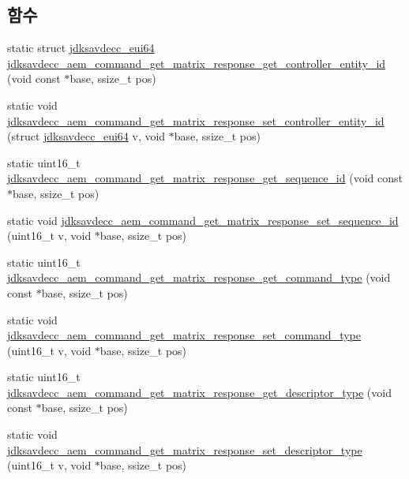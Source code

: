 \subsection*{함수}
\begin{DoxyCompactItemize}
\item 
static struct \hyperlink{structjdksavdecc__eui64}{jdksavdecc\+\_\+eui64} \hyperlink{group__command__get__matrix__response_ga5a241a121678094e29e9a07c0ed04ced}{jdksavdecc\+\_\+aem\+\_\+command\+\_\+get\+\_\+matrix\+\_\+response\+\_\+get\+\_\+controller\+\_\+entity\+\_\+id} (void const $\ast$base, ssize\+\_\+t pos)
\item 
static void \hyperlink{group__command__get__matrix__response_ga9e3f28470511eb5369e2586320e3ef57}{jdksavdecc\+\_\+aem\+\_\+command\+\_\+get\+\_\+matrix\+\_\+response\+\_\+set\+\_\+controller\+\_\+entity\+\_\+id} (struct \hyperlink{structjdksavdecc__eui64}{jdksavdecc\+\_\+eui64} v, void $\ast$base, ssize\+\_\+t pos)
\item 
static uint16\+\_\+t \hyperlink{group__command__get__matrix__response_ga28c83fd2f23634391b757edbf3bb09d7}{jdksavdecc\+\_\+aem\+\_\+command\+\_\+get\+\_\+matrix\+\_\+response\+\_\+get\+\_\+sequence\+\_\+id} (void const $\ast$base, ssize\+\_\+t pos)
\item 
static void \hyperlink{group__command__get__matrix__response_ga4960574ef677af539e9538f54f06f518}{jdksavdecc\+\_\+aem\+\_\+command\+\_\+get\+\_\+matrix\+\_\+response\+\_\+set\+\_\+sequence\+\_\+id} (uint16\+\_\+t v, void $\ast$base, ssize\+\_\+t pos)
\item 
static uint16\+\_\+t \hyperlink{group__command__get__matrix__response_gad5214f8f0eb608a58db65cace21f5257}{jdksavdecc\+\_\+aem\+\_\+command\+\_\+get\+\_\+matrix\+\_\+response\+\_\+get\+\_\+command\+\_\+type} (void const $\ast$base, ssize\+\_\+t pos)
\item 
static void \hyperlink{group__command__get__matrix__response_ga6e180533ac3299a9f221c96f123d0455}{jdksavdecc\+\_\+aem\+\_\+command\+\_\+get\+\_\+matrix\+\_\+response\+\_\+set\+\_\+command\+\_\+type} (uint16\+\_\+t v, void $\ast$base, ssize\+\_\+t pos)
\item 
static uint16\+\_\+t \hyperlink{group__command__get__matrix__response_ga69958e72b1d4189f9c21965b6f40d17a}{jdksavdecc\+\_\+aem\+\_\+command\+\_\+get\+\_\+matrix\+\_\+response\+\_\+get\+\_\+descriptor\+\_\+type} (void const $\ast$base, ssize\+\_\+t pos)
\item 
static void \hyperlink{group__command__get__matrix__response_ga5d3bbb8b993435678aa79add5f92fd32}{jdksavdecc\+\_\+aem\+\_\+command\+\_\+get\+\_\+matrix\+\_\+response\+\_\+set\+\_\+descriptor\+\_\+type} (uint16\+\_\+t v, void $\ast$base, ssize\+\_\+t pos)

\end{DoxyCompactItemize}
